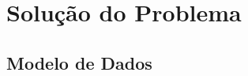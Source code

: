 %
%
\chapter{Solução do Problema} \label{cap3}

\section{Modelo de Dados}\label{sec31}

\vspace{15cm}
\begin{minipage}[l]{40cm}
	
\end{minipage}\\
